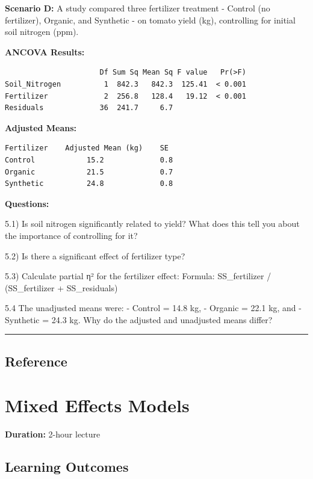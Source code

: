 \documentclass[
]{book}
\begin{document}
\textbf{Scenario D:} A study compared three fertilizer treatment - Control (no fertilizer), Organic, and Synthetic - on tomato yield (kg), controlling for initial soil nitrogen (ppm).

\textbf{ANCOVA Results:}

\begin{verbatim}
                      Df Sum Sq Mean Sq F value   Pr(>F)
Soil_Nitrogen          1  842.3   842.3  125.41  < 0.001
Fertilizer             2  256.8   128.4   19.12  < 0.001
Residuals             36  241.7     6.7
\end{verbatim}

\textbf{Adjusted Means:}

\begin{verbatim}
Fertilizer    Adjusted Mean (kg)    SE
Control            15.2             0.8
Organic            21.5             0.7
Synthetic          24.8             0.8
\end{verbatim}

\textbf{Questions:}

5.1) Is soil nitrogen significantly related to yield? What does this tell you about the importance of controlling for it?

5.2) Is there a significant effect of fertilizer type?

5.3) Calculate partial η² for the fertilizer effect: Formula: SS\_fertilizer / (SS\_fertilizer + SS\_residuals)

5.4 The unadjusted means were:
- Control = 14.8 kg,
- Organic = 22.1 kg, and
- Synthetic = 24.3 kg.
Why do the adjusted and unadjusted means differ?

\begin{center}\rule{0.5\linewidth}{0.5pt}\end{center}

\section{Reference}\label{reference}

\chapter{Mixed Effects Models}\label{mixed-effects-models}

\textbf{Duration:} 2-hour lecture

\section{Learning Outcomes}\label{learning-outcomes-11}
\end{document}
